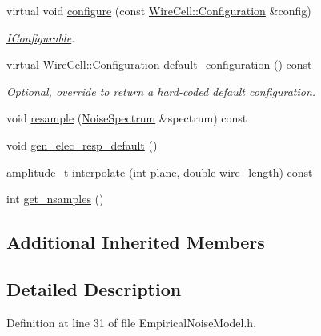 \begin{DoxyCompactItemize}
virtual void \hyperlink{class_wire_cell_1_1_gen_1_1_empirical_noise_model_aa38f65fc1f32c8017f8205b32850074e}{configure} (const \hyperlink{namespace_wire_cell_a9f705541fc1d46c608b3d32c182333ee}{Wire\+Cell\+::\+Configuration} \&config)
\begin{DoxyCompactList}\small\item\em \hyperlink{class_wire_cell_1_1_i_configurable}{I\+Configurable}. \end{DoxyCompactList}\item 
virtual \hyperlink{namespace_wire_cell_a9f705541fc1d46c608b3d32c182333ee}{Wire\+Cell\+::\+Configuration} \hyperlink{class_wire_cell_1_1_gen_1_1_empirical_noise_model_a683bdf03c14c78ff74b12a844a688c61}{default\+\_\+configuration} () const
\begin{DoxyCompactList}\small\item\em Optional, override to return a hard-\/coded default configuration. \end{DoxyCompactList}\item 
void \hyperlink{class_wire_cell_1_1_gen_1_1_empirical_noise_model_a35db0e36d1426041740535fc2da0b07d}{resample} (\hyperlink{struct_wire_cell_1_1_gen_1_1_empirical_noise_model_1_1_noise_spectrum}{Noise\+Spectrum} \&spectrum) const
\item 
void \hyperlink{class_wire_cell_1_1_gen_1_1_empirical_noise_model_abf5f2823eb9522997306417ddd1d9ca4}{gen\+\_\+elec\+\_\+resp\+\_\+default} ()
\item 
\hyperlink{class_wire_cell_1_1_i_channel_spectrum_a9af7bfed961f49dc8a532fd5d0bf3e6e}{amplitude\+\_\+t} \hyperlink{class_wire_cell_1_1_gen_1_1_empirical_noise_model_a5b1d7a97da1b07237cf03b28a2caacdf}{interpolate} (int plane, double wire\+\_\+length) const
\item 
int \hyperlink{class_wire_cell_1_1_gen_1_1_empirical_noise_model_a29809eaa37653939840eda3863a66ac5}{get\+\_\+nsamples} ()
\end{DoxyCompactItemize}
\subsection*{Additional Inherited Members}


\subsection{Detailed Description}


Definition at line 31 of file Empirical\+Noise\+Model.\+h.



